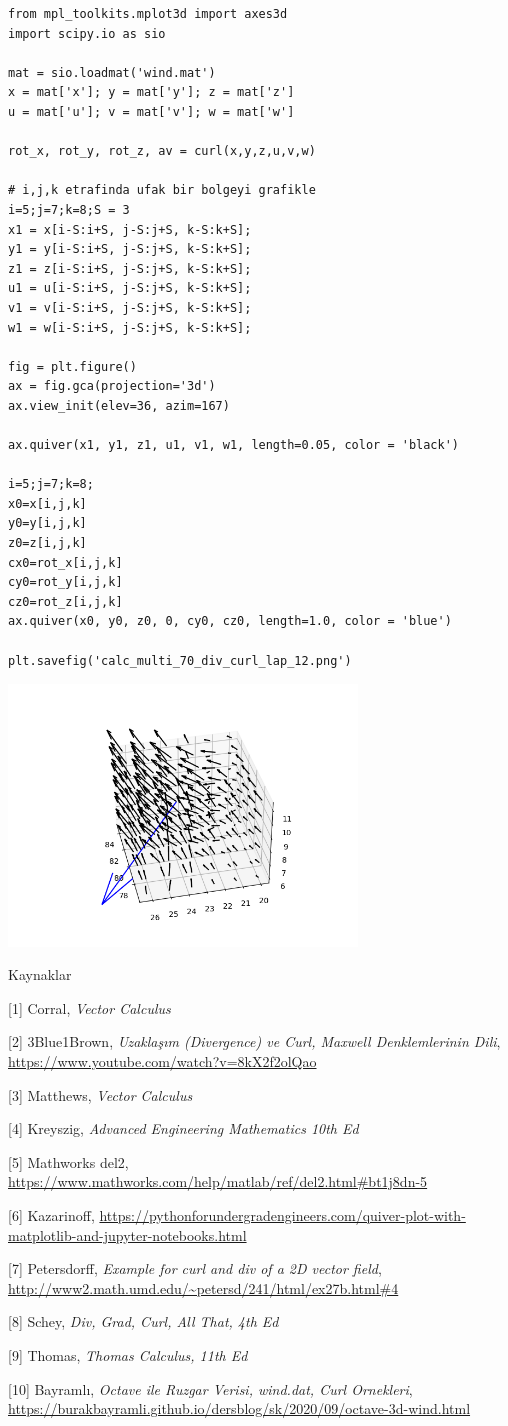 \documentclass[12pt,fleqn]{article}\usepackage{../../common}
\begin{document}
\begin{verbatim}
from mpl_toolkits.mplot3d import axes3d
import scipy.io as sio

mat = sio.loadmat('wind.mat')
x = mat['x']; y = mat['y']; z = mat['z']
u = mat['u']; v = mat['v']; w = mat['w']

rot_x, rot_y, rot_z, av = curl(x,y,z,u,v,w)

# i,j,k etrafinda ufak bir bolgeyi grafikle
i=5;j=7;k=8;S = 3
x1 = x[i-S:i+S, j-S:j+S, k-S:k+S]; 
y1 = y[i-S:i+S, j-S:j+S, k-S:k+S]; 
z1 = z[i-S:i+S, j-S:j+S, k-S:k+S];
u1 = u[i-S:i+S, j-S:j+S, k-S:k+S]; 
v1 = v[i-S:i+S, j-S:j+S, k-S:k+S]; 
w1 = w[i-S:i+S, j-S:j+S, k-S:k+S];

fig = plt.figure()
ax = fig.gca(projection='3d')
ax.view_init(elev=36, azim=167)

ax.quiver(x1, y1, z1, u1, v1, w1, length=0.05, color = 'black')

i=5;j=7;k=8;
x0=x[i,j,k]
y0=y[i,j,k]
z0=z[i,j,k]
cx0=rot_x[i,j,k]
cy0=rot_y[i,j,k]
cz0=rot_z[i,j,k]
ax.quiver(x0, y0, z0, 0, cy0, cz0, length=1.0, color = 'blue')

plt.savefig('calc_multi_70_div_curl_lap_12.png')
\end{verbatim}

\includegraphics[width=25em]{calc_multi_70_div_curl_lap_12.png}


Kaynaklar 

[1] Corral, {\em Vector Calculus}

[2] 3Blue1Brown, {\em Uzaklaşım (Divergence) ve Curl, Maxwell Denklemlerinin Dili},
    \url{https://www.youtube.com/watch?v=8kX2f2olQao}

[3] Matthews, {\em Vector Calculus}

[4] Kreyszig, {\em Advanced Engineering Mathematics 10th Ed}

[5] Mathworks del2, \url{https://www.mathworks.com/help/matlab/ref/del2.html#bt1j8dn-5}

[6] Kazarinoff, \url{https://pythonforundergradengineers.com/quiver-plot-with-matplotlib-and-jupyter-notebooks.html}

[7] Petersdorff, {\em Example for curl and div of a 2D vector field}, \url{http://www2.math.umd.edu/~petersd/241/html/ex27b.html#4}

[8] Schey, {\em Div, Grad, Curl, All That, 4th Ed}

[9] Thomas, {\em Thomas Calculus, 11th Ed}

[10] Bayramlı, {\em Octave ile Ruzgar Verisi, wind.dat, Curl Ornekleri},
     \url{https://burakbayramli.github.io/dersblog/sk/2020/09/octave-3d-wind.html}
\end{document}

